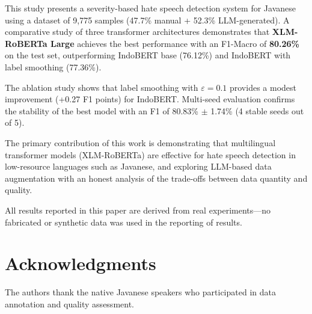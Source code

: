 \documentclass[10pt,twocolumn]{article}
\begin{document}
This study presents a severity-based hate speech detection system for Javanese using a dataset of 9,775 samples (47.7\% manual + 52.3\% LLM-generated). A comparative study of three transformer architectures demonstrates that \textbf{XLM-RoBERTa Large} achieves the best performance with an F1-Macro of \textbf{80.26\%} on the test set, outperforming IndoBERT base (76.12\%) and IndoBERT with label smoothing (77.36\%).

The ablation study shows that label smoothing with $\varepsilon=0.1$ provides a modest improvement (+0.27 F1 points) for IndoBERT. Multi-seed evaluation confirms the stability of the best model with an F1 of 80.83\% $\pm$ 1.74\% (4 stable seeds out of 5).

The primary contribution of this work is demonstrating that multilingual transformer models (XLM-RoBERTa) are effective for hate speech detection in low-resource languages such as Javanese, and exploring LLM-based data augmentation with an honest analysis of the trade-offs between data quantity and quality.

All results reported in this paper are derived from real experiments---no fabricated or synthetic data was used in the reporting of results.

\section*{Acknowledgments}

The authors thank the native Javanese speakers who participated in data annotation and quality assessment.
\end{document}
